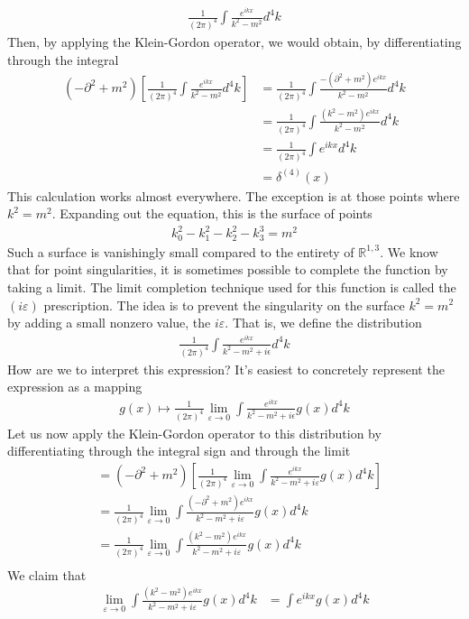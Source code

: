 \documentclass[book.tex]{subfiles}
\begin{document}
\begin{align}
    \frac{1}{(2\pi)^4} \int \frac{e^{ikx}}{k^2-m^2} d^4 k
\end{align}
Then, by applying the Klein-Gordon operator, we would obtain, by differentiating through the integral
\begin{align}
    (-\partial^2 + m^2) \left [ \frac{1}{(2\pi)^4} \int \frac{e^{ikx}}{k^2 - m^2} d^4 k \right ] &= \frac{1}{(2\pi)^4} \int \frac{-(\partial^2 +m^2) e^{ikx}}{k^2 - m^2} d^4 k \\
    &= \frac{1}{(2\pi)^4} \int \frac{(k^2-m^2)e^{ikx}}{k^2-m^2} d^4 k  \\
    &= \frac{1}{(2\pi)^4} \int e^{ikx} d^4 k \\
    &= \delta^{(4)}(x)
\end{align}
This calculation works almost everywhere. The exception is at those points where $k^2 = m^2$. Expanding out the equation, this is the surface of points
\begin{align}
    k_0^2 - k_1^2 - k_2^2 - k_3^3 = m^2
\end{align}
Such a surface is vanishingly small compared to the entirety of $\mathbb{R}^{1,3}$. We know that for point singularities, it is sometimes possible to complete the function by taking a limit. The limit completion technique used for this function is called the $(i\varepsilon)$ prescription. The idea is to prevent the singularity on the surface $k^2 = m^2$ by adding a small nonzero value, the $i\varepsilon$. That is, we define the distribution
\begin{align}
    \frac{1}{(2\pi)^4} \int \frac{e^{ikx}}{k^2-m^2 + i\epsilon} d^4 k
\end{align}
How are we to interpret this expression? It's easiest to concretely represent the expression as a mapping
\begin{align}
    g(x) \mapsto \frac{1}{(2\pi)^4} \lim_{\varepsilon \to 0} \int \frac{e^{ikx}}{k^2 - m^2 + i \epsilon} g(x) d^4 k
\end{align}
Let us now apply the Klein-Gordon operator to this distribution by differentiating through the integral sign and through the limit
\begin{align}
    &= (-\partial^2 + m^2) \left [ \frac{1}{(2\pi)^4} \lim_{\varepsilon \to 0} \int \frac{e^{ikx}}{k^2 - m^2 + i \varepsilon} g(x) d^4k\right ] \\
    &= \frac{1}{(2\pi)^4} \lim_{\varepsilon \to 0} \int \frac{(-\partial^2 + m^2)e^{ikx}}{k^2 - m^2 + i\varepsilon} g(x) d^4 k \\
    &= \frac{1}{(2\pi)^4} \lim_{\varepsilon \to 0} \int \frac{(k^2 - m^2)e^{ikx}}{k^2 - m^2 + i\varepsilon} g(x) d^4 k \\
\end{align}
We claim that 
\begin{align}
    \lim_{\varepsilon \to 0} \int \frac{(k^2-m^2)e^{ikx}}{k^2-m^2+i\varepsilon} g(x) d^4k &= \int e^{ikx} g(x) d^4k
\end{align}
\end{document}
